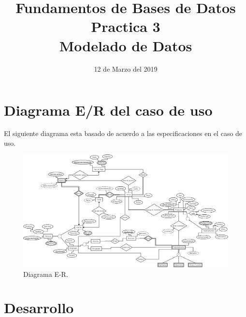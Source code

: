 \documentclass[10pt]{article}
\begin{document}
	\title{Fundamentos de Bases de Datos \\
		Practica 3\\ Modelado de Datos
	} 
	\author{}
	\date{12 de Marzo del 2019}
	\maketitle
	
	\section{Diagrama E/R del caso de uso}
	
	El siguiente diagrama esta basado de acuerdo a las especificaciones en el caso de uso.
	
		\begin{figure}[H]
		\centering
		\includegraphics[width=1 \textwidth]{practica03.jpeg}
		\caption{Diagrama E-R.}
	\end{figure}


\section{Desarrollo}
\end{document}
